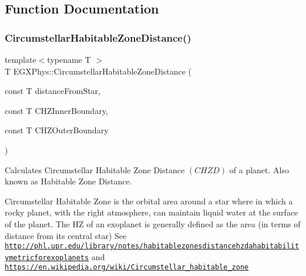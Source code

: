 \subsection{Function Documentation}
\mbox{\label{group___e_g_x_phys-_circumstellar_habitable_zone_limit_gaf289fb8f037ece66d850f7d827f83752}} 
\subsubsection{\texorpdfstring{Circumstellar\+Habitable\+Zone\+Distance()}{CircumstellarHabitableZoneDistance()}}
{\footnotesize\ttfamily template$<$typename T $>$ \\
T E\+G\+X\+Phys\+::\+Circumstellar\+Habitable\+Zone\+Distance (\begin{DoxyParamCaption}\item[{const T}]{distance\+From\+Star,  }\item[{const T}]{C\+H\+Z\+Inner\+Boundary,  }\item[{const T}]{C\+H\+Z\+Outer\+Boundary }\end{DoxyParamCaption})}



Calculates Circumstellar Habitable Zone Distance $(CHZD)$ of a planet. Also known as Habitable Zone Distance. 

Circumstellar Habitable Zone is the orbital area around a star where in which a rocky planet, with the right atmosphere, can maintain liquid water at the surface of the planet. The HZ of an exoplanet is generally defined as the area (in terms of distance from its central star) See \href{http://phl.upr.edu/library/notes/habitablezonesdistancehzdahabitabilitymetricforexoplanets}{\tt http\+://phl.\+upr.\+edu/library/notes/habitablezonesdistancehzdahabitabilitymetricforexoplanets} and \href{https://en.wikipedia.org/wiki/Circumstellar_habitable_zone}{\tt https\+://en.\+wikipedia.\+org/wiki/\+Circumstellar\+\_\+habitable\+\_\+zone}

